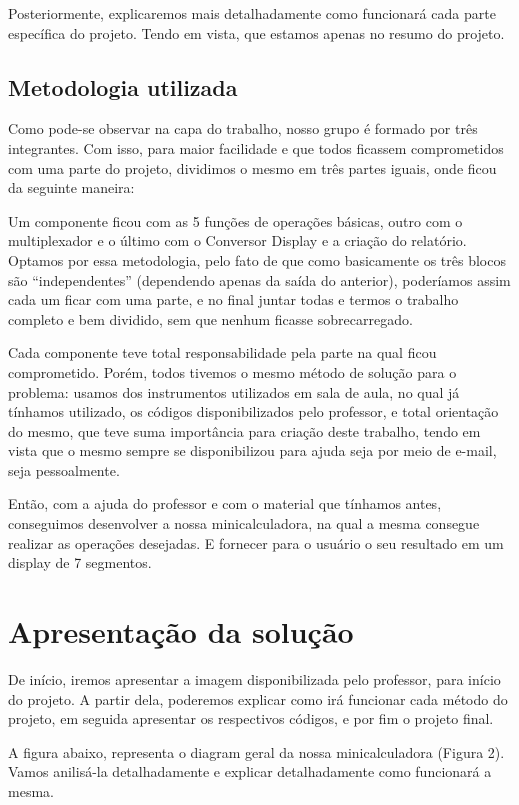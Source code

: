 \documentclass[
	12pt,				%
	openright,			%
	oneside,			%
	a4paper,			%
	brazil,				%
	]{abntex2}
\begin{document}
Posteriormente, explicaremos mais detalhadamente como funcionará cada parte específica do projeto. Tendo em vista, que estamos apenas no resumo do projeto.
    
\section{Metodologia utilizada}

Como pode-se observar na capa do trabalho, nosso grupo é formado por três integrantes. Com isso, para maior facilidade e que todos ficassem comprometidos com uma parte do projeto, dividimos o mesmo em três partes iguais, onde ficou da seguinte maneira:
	
Um componente ficou com as 5 funções de operações básicas, outro com o multiplexador e o último com o Conversor Display e a criação do relatório. Optamos por essa metodologia, pelo fato de que como basicamente os três blocos são “independentes” (dependendo apenas da saída do anterior), poderíamos assim cada um ficar com uma parte, e no final juntar todas e termos o trabalho completo e bem dividido, sem que nenhum ficasse sobrecarregado.
	
Cada componente teve total responsabilidade pela parte na qual ficou comprometido. Porém, todos tivemos o mesmo método de solução para o problema: usamos dos instrumentos utilizados em sala de aula, no qual já tínhamos utilizado, os códigos disponibilizados pelo professor, e total orientação do mesmo, que teve suma importância para criação deste trabalho, tendo em vista que o mesmo sempre se disponibilizou para ajuda seja por meio de e-mail, seja pessoalmente.  

Então, com a ajuda do professor e com o material que tínhamos antes, conseguimos desenvolver a nossa minicalculadora, na qual a mesma consegue realizar as operações desejadas. E fornecer para o usuário o seu resultado em um display de 7 segmentos.
	    
\chapter{Apresentação da solução}

De início, iremos apresentar a imagem disponibilizada pelo professor, para início do projeto. A partir dela, poderemos explicar como irá funcionar cada método do projeto, em seguida apresentar os respectivos códigos, e por fim o projeto final.

A figura abaixo, representa o diagram geral da nossa minicalculadora (Figura 2). Vamos anilisá-la detalhadamente e explicar detalhadamente como funcionará a mesma.  
\end{document}
